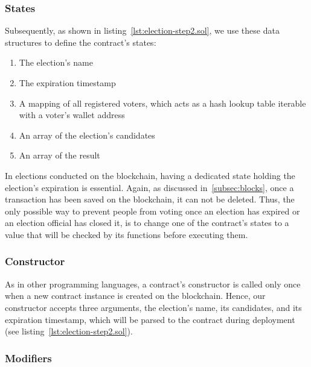 
\subsubsection{States}

Subsequently, as shown in listing~\ref{lst:election-step2.sol}, we use these data structures to define the contract's states: 

\begin{enumerate}
    \item The election's name
    \item The expiration timestamp
    \item A mapping of all registered voters, which acts as a hash lookup table iterable with a voter's wallet address~\autocite[137]{antonopoulos_mastering_2019}
    \item An array of the election's candidates
    \item An array of the result
\end{enumerate}

In elections conducted on the blockchain, having a dedicated state holding the election's expiration is essential.
Again, as discussed in~\cref{subsec:blocks}, once a transaction has been saved on the blockchain, it can not be deleted.
Thus, the only possible way to prevent people from voting once an election has expired or an election official has closed it, is to change one of the contract's states to a value that will be checked by its functions before executing them.

\subsubsection{Constructor}

As in other programming languages, a contract's constructor is called only once when a new contract instance is created on the blockchain.
Hence, our constructor accepts three arguments, the election's name, its candidates, and its expiration timestamp, which will be parsed to the contract during deployment (see listing~\ref{lst:election-step2.sol}).

\subsubsection{Modifiers}

